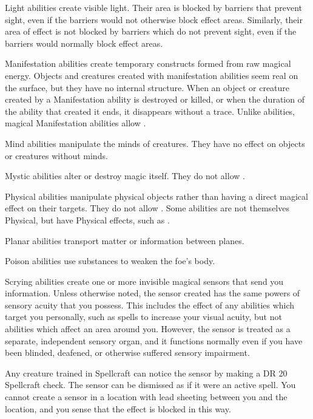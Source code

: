          Light abilities create visible light.
        Their area is blocked by barriers that prevent sight, even if the barriers would not otherwise block effect areas.
        Similarly, their area of effect is not blocked by barriers which do not prevent sight, even if the barriers would normally block effect areas.

         Manifestation abilities create temporary constructs formed from raw magical energy.
        Objects and creatures created with manifestation abilities seem real on the surface, but they have no internal structure.
        When an object or creature created by a Manifestation ability is destroyed or killed, or when the duration of the ability that created it ends, it disappears without a trace.
        Unlike  abilities, magical Manifestation abilities allow .

         Mind abilities manipulate the minds of creatures.
        They have no effect on objects or creatures without minds.

         Mystic abilities alter or destroy magic itself.
        They do not allow .

         Physical abilities manipulate physical objects rather than having a direct magical effect on their targets.
        They do not allow .
        Some abilities are not themselves Physical, but have Physical effects, such as .

         Planar abilities transport matter or information between planes.

         Poison abilities use substances to weaken the foe's body.

         Scrying abilities create one or more invisible magical sensors that send you information.
        Unless otherwise noted, the sensor created has the same powers of sensory acuity that you possess.
        This includes the effect of any abilities which target you personally, such as spells to increase your visual acuity, but not abilities which affect an area around you.
        However, the sensor is treated as a separate, independent sensory organ, and it functions normally even if you have been blinded, deafened, or otherwise suffered sensory impairment.
        \par Any creature trained in Spellcraft can notice the sensor by making a DR 20 Spellcraft check.
        The sensor can be dismissed as if it were an active spell.
        You cannot create a sensor in a location with lead sheeting between you and the location, and you sense that the effect is blocked in this way.
        \\


